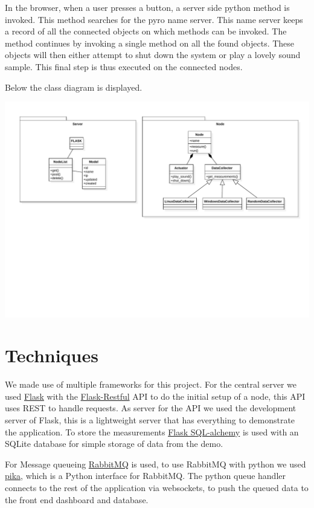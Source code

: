 \documentclass{article}
\begin{document}
	In the browser, when a user presses a button, a server side python method is 
	invoked. This method searches for the pyro name server. This name server 
	keeps a record of all the connected objects on which methods can be invoked.
	The method continues by invoking a single method on all the found objects.
	These objects will then either attempt to shut down the system or play a
	lovely sound sample. This final step is thus executed on the connected nodes.

	Below the class diagram is displayed.
	
	\includegraphics[width=\textwidth, trim={60 250 0 0}]{classdiagram.pdf}

\section{Techniques}
	We made use of multiple frameworks for this project. For the central server
	we used \href{http://flask.pocoo.org/}{Flask} with the 
	\href{https://flask-restful.readthedocs.io/en/0.3.5/}{Flask-Restful} API to
	do the initial setup of a node, this API uses REST to handle requests. As
	server for the API we used the development server of Flask, this is a 
	lightweight server that has everything to demonstrate the application. To 
	store the measurements 
	\href{http://flask-sqlalchemy.pocoo.org/2.1/}{Flask SQL-alchemy} is used 
	with an SQLite database for simple storage of data from the demo.
	
	For Message queueing \href{https://www.rabbitmq.com}{RabbitMQ} is used, to 
	use RabbitMQ with python we used \href{https://github.com/pika/pika}{pika}, 
	which is a Python interface for RabbitMQ. The python queue handler connects
	to the rest of the application via websockets, to push the queued data to 
	the front end dashboard and database.
\end{document}
